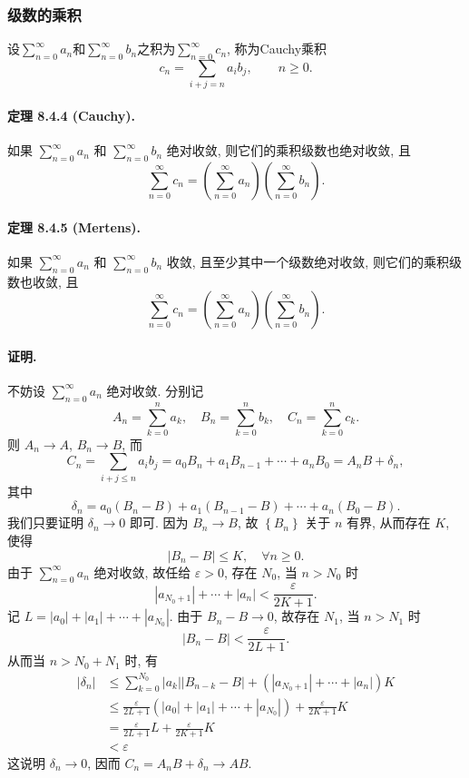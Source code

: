\subsubsection{级数的乘积}

设$\sum_{n=0}^{\infty}a_{n}$和$\sum_{n=0}^{\infty}b_{n}$之积为$\sum_{n=0}^{\infty}c_{n}$,
称为Cauchy乘积
\[
c_{n}=\sum_{i+j=n}a_{i}b_{j},\qquad n\ge0.
\]


\paragraph{定理 8.4.4 (Cauchy). }

如果 $\sum_{n=0}^{\infty}a_{n}$ 和 $\sum_{n=0}^{\infty}b_{n}$ 绝对收敛,
则它们的乘积级数也绝对收敛, 且 
\[
\sum_{n=0}^{\infty}c_{n}=\left(\sum_{n=0}^{\infty}a_{n}\right)\left(\sum_{n=0}^{\infty}b_{n}\right).
\]


\paragraph{定理 8.4.5 (Mertens). }

如果 $\sum_{n=0}^{\infty}a_{n}$ 和 $\sum_{n=0}^{\infty}b_{n}$ 收敛, 且至少其中一个级数绝对收敛,
则它们的乘积级数也收敛, 且 
\[
\sum_{n=0}^{\infty}c_{n}=\left(\sum_{n=0}^{\infty}a_{n}\right)\left(\sum_{n=0}^{\infty}b_{n}\right).
\]


\paragraph{证明. }

不妨设 $\sum_{n=0}^{\infty}a_{n}$ 绝对收敛. 分别记 
\[
A_{n}=\sum_{k=0}^{n}a_{k},\quad B_{n}=\sum_{k=0}^{n}b_{k},\quad C_{n}=\sum_{k=0}^{n}c_{k}.
\]
则 $A_{n}\rightarrow A$, $B_{n}\rightarrow B$, 而 
\[
C_{n}=\sum_{i+j\leqslant n}a_{i}b_{j}=a_{0}B_{n}+a_{1}B_{n-1}+\cdots+a_{n}B_{0}=A_{n}B+\delta_{n},
\]
其中 
\[
\delta_{n}=a_{0}\left(B_{n}-B\right)+a_{1}\left(B_{n-1}-B\right)+\cdots+a_{n}\left(B_{0}-B\right).
\]
我们只要证明 $\delta_{n}\rightarrow0$ 即可. 因为 $B_{n}\rightarrow B$, 故 $\left\{ B_{n}\right\} $
关于 $n$ 有界, 从而存在 $K$, 使得 
\[
\left|B_{n}-B\right|\leqslant K,\quad\forall n\geqslant0.
\]
由于 $\sum_{n=0}^{\infty}a_{n}$ 绝对收敛, 故任给 $\varepsilon>0$, 存在 $N_{0}$,
当 $n>N_{0}$ 时 
\[
\left|a_{N_{0}+1}\right|+\cdots+\left|a_{n}\right|<\frac{\varepsilon}{2K+1}.
\]
记 $L=\left|a_{0}\right|+\left|a_{1}\right|+\cdots+\left|a_{N_{0}}\right|$.
由于 $B_{n}-B\rightarrow0$, 故存在 $N_{1}$, 当 $n>N_{1}$ 时 
\[
\left|B_{n}-B\right|<\frac{\varepsilon}{2L+1}.
\]
从而当 $n>N_{0}+N_{1}$ 时, 有 
\[
\begin{aligned}\left|\delta_{n}\right| & \leqslant\sum_{k=0}^{N_{0}}\left|a_{k}\right|\left|B_{n-k}-B\right|+\left(\left|a_{N_{0}+1}\right|+\cdots+\left|a_{n}\right|\right)K\\
	& \leqslant\frac{\varepsilon}{2L+1}\left(\left|a_{0}\right|+\left|a_{1}\right|+\cdots+\left|a_{N_{0}}\right|\right)+\frac{\varepsilon}{2K+1}K\\
	& =\frac{\varepsilon}{2L+1}L+\frac{\varepsilon}{2K+1}K\\
	& <\varepsilon
\end{aligned}
\]
这说明 $\delta_{n}\rightarrow0$, 因而 $C_{n}=A_{n}B+\delta_{n}\rightarrow AB$.

